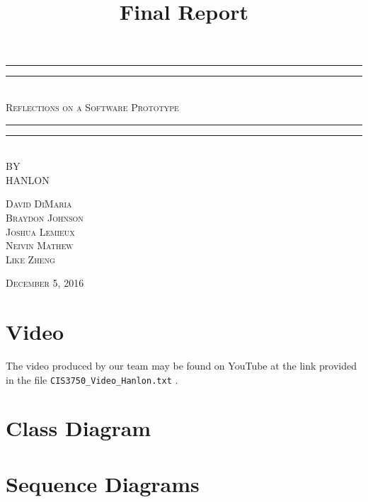 \documentclass[12pt,letterpaper]{article}
\title{Final Report}
\begin{document}
\begin{titlepage}
    \centering
    \vspace*{\baselineskip}
    \rule{\textwidth}{1.6pt}\vspace*{-\baselineskip}\vspace*{2pt}
    \rule{\textwidth}{0.4pt}\\[1.5\baselineskip]
    {\LARGE \textsc{Reflections on a Software Prototype}}\\[\baselineskip]
	\rule{\textwidth}{0.4pt}\vspace*{-\baselineskip}\vspace{4pt}    
    \rule{\textwidth}{2pt}\\[2\baselineskip]
   
    \vspace*{5\baselineskip}
    \textsc{BY}\\[0.25\baselineskip]
    {\LARGE HANLON} \\
    
    \vspace*{\baselineskip}
    {\textsc{David DiMaria \\ Braydon Johnson \\ Joshua Lemieux \\ Neivin Mathew \\ Like Zheng} \par}
    \vfill
    {\scshape December 5, 2016} \\
  \end{titlepage}
  
  
\tableofcontents
\lhead{} %
\clearpage
{} %
    
\clearpage
\section{Video}
The video produced by our team may be found on YouTube at the link provided in the file \texttt{CIS3750\_Video\_Hanlon.txt} .

\clearpage
\section{Class Diagram}


\clearpage
\section{Sequence Diagrams}
\end{document}
